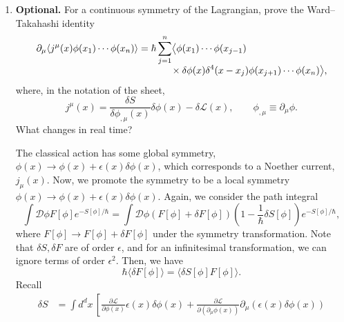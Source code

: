 \begin{enumerate}[label=\alph*)]
    \item \textbf{Optional.} For a continuous symmetry of the Lagrangian, prove
    the Ward--Takahashi identity
    \begin{align}
        \partial_\mu
        \langle j^\mu(x)\phi(x_1)\cdots\phi(x_n)\rangle
        ={}&
        \hbar\sum_{j=1}^{n}
        \bigl\langle
            \phi(x_1)\cdots\phi(x_{j-1})
            \notag\\[-0.4em]
            &\qquad\times
            \delta\phi(x)\delta^4(x-x_j)
            \phi(x_{j+1})\cdots\phi(x_n)
        \bigr\rangle,
    \end{align}
    where, in the notation of the sheet,
    \begin{equation}
        j^\mu(x)
        =\frac{\delta S}{\delta\phi_{,\mu}(x)}\delta\phi(x)
        -\delta\mathcal L(x),
        \qquad
        \phi_{,\mu}\equiv\partial_\mu\phi.
    \end{equation}
    What changes in real time?
    \begin{solution}
        The classical action has some global symmetry, $\phi(x) \to \phi(x) + \epsilon(x) \delta\phi(x)$, which corresponds to a Noether current, $j_\mu(x)$.
        Now, we promote the symmetry to be a local symmetry $\phi(x) \to \phi(x) + \epsilon(x)\delta\phi(x)$. Again, we consider the path integral
        \begin{equation}
            \int \mathcal{D}\phi F[\phi] e^{-S[\phi]/\hbar} = \int  \mathcal{D}\phi (F[\phi]+\delta F[\phi])\left(1 -  \frac{1}{\hbar}\delta S[\phi]\right)e^{-S[\phi]/\hbar},
        \end{equation}
        where $F[\phi] \to F[\phi] + \delta F[\phi]$ under the symmetry transformation. Note that $\delta S, \delta F$ are of order $\epsilon$, and for an infinitesimal transformation, we can ignore terms of order $\epsilon^2$. Then, we have
        \begin{equation}
            \hbar \langle\delta F[\phi]\rangle = \langle\delta S[\phi]F[\phi]\rangle.
        \end{equation}
        Recall
\begin{equation}
    \begin{aligned}
        \delta S
        &=
        \int d^d x\,
        \left[
            \frac{\partial\mathcal L}{\partial\phi(x)}
            \epsilon(x)\delta\phi(x)
            +
            \frac{\partial\mathcal L}
            {\partial(\partial_\mu\phi(x))}
            \partial_\mu\!\left(
                \epsilon(x)\delta\phi(x)
            \right)

\end{aligned}
\end{equation}
\end{solution}
\end{enumerate}
